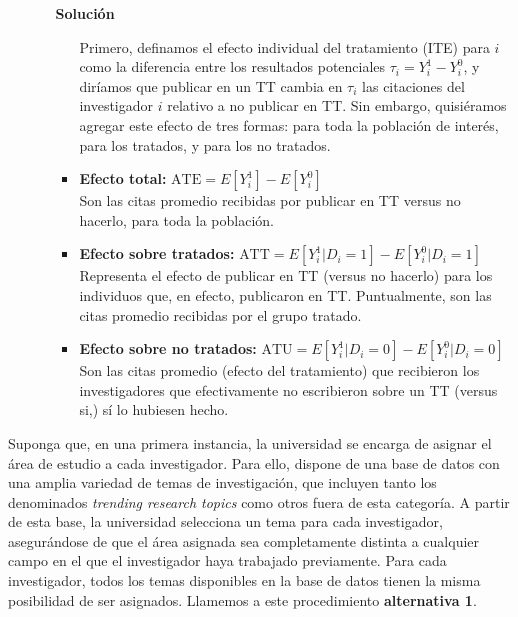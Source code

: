 \documentclass[a4paper, answers, addpoints, 11pt]{exam}
\newenvironment{solucion}{%
  \begin{mdframed}[
    backgroundcolor=blue!5,    %
    linecolor=blue!50,          %
    linewidth=2pt,              %
    leftmargin=10pt,            %
    rightmargin=10pt,           %
    topline=true,              %
    bottomline=true,            %
    roundcorner=10pt,           %
    innerleftmargin=10pt,       %
    innerrightmargin=10pt,      %
    innerbottommargin=10pt,     %
    innertopmargin=10pt         %
  ]%
  \begin{tcolorbox}[colframe=blue!50!black, colback=blue!50, coltitle=white, sharp corners=all, boxrule=1mm, width=\textwidth, halign=left, valign=center, top=0mm, bottom=0mm, left=0mm, right=0mm] \textbf{Solución} \end{tcolorbox} }{\end{mdframed}}
\begin{document}
\begin{itemize}
\begin{itemize}
\begin{solucion}
        \begin{itemize}
    Primero, definamos el efecto individual del tratamiento (ITE) para $i$ como la diferencia entre los resultados potenciales $\tau_i=Y_i^1-Y_i^0$, y diríamos que publicar en un TT cambia en $\tau_i$ las citaciones del investigador $i$ relativo a no publicar en TT. Sin embargo, quisiéramos agregar este efecto de tres formas: para toda la población de interés, para los tratados, y para los no tratados.
    \item \textbf{Efecto total:} \( \text{ATE} = E[Y_i^1] - E[Y_i^0] \) \\
    Son las citas promedio recibidas por publicar en TT versus no hacerlo, para toda la población. 
    \item \textbf{Efecto sobre tratados:} \( \text{ATT} = E[Y_i^1 | D_i = 1] - E[Y_i^0 | D_i = 1] \)\\
    Representa el efecto de publicar en TT (versus no hacerlo) para los individuos que, en efecto, publicaron en TT. Puntualmente, son las citas promedio recibidas por el grupo tratado.
    
    \item \textbf{Efecto sobre no tratados:} \( \text{ATU} = E[Y_i^1 | D_i = 0] - E[Y_i^0 | D_i = 0] \)\\
    Son las citas promedio (efecto del tratamiento) que recibieron los investigadores que efectivamente no escribieron sobre un TT (versus  si,) sí lo hubiesen hecho.
\end{itemize}

        \end{solucion}
    \end{itemize}

\end{itemize}
\bigskip

Suponga que, en una primera instancia, la universidad se encarga de asignar el área de estudio a cada investigador. Para ello, dispone de una base de datos con una amplia variedad de temas de investigación, que incluyen tanto los denominados \textit{trending research topics} como otros fuera de esta categoría. A partir de esta base, la universidad selecciona un tema para cada investigador, asegurándose de que el área asignada sea completamente distinta a cualquier campo en el que el investigador haya trabajado previamente. Para cada investigador, todos los temas disponibles en la base de datos tienen la misma posibilidad de ser asignados. Llamemos a este procedimiento \textbf{alternativa 1}. \\
\end{document}
